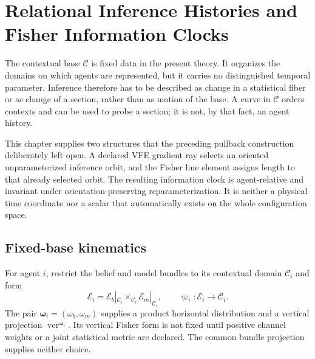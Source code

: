 \chapter{Relational Inference Histories and Fisher Information Clocks}
\label{ch:relational-inference}

The contextual base $\mathcal C$ is fixed data in the present theory.  It
organizes the domains on which agents are represented, but it carries no
distinguished temporal parameter.  Inference therefore has to be described
as change in a statistical fiber or as change of a section, rather than as
motion of the base.  A curve in $\mathcal C$ orders contexts and can be used
to probe a section; it is not, by that fact, an agent history.

This chapter supplies two structures that the preceding pullback construction
deliberately left open.  A declared VFE gradient ray selects an oriented
unparameterized inference orbit, and the Fisher line element assigns length
to that already selected orbit.  The resulting information clock is
agent-relative and invariant under orientation-preserving
reparameterization.  It is neither a physical time coordinate nor a scalar
that automatically exists on the whole configuration space.

\section{Fixed-base kinematics}
\label{sec:hist-fixed-base-kinematics}

For agent $i$, restrict the belief and model bundles to its contextual domain
$\mathcal C_i$ and form
\begin{equation}
\mathcal E_i
=\mathcal E_b|_{\mathcal C_i}
\times_{\mathcal C_i}
\mathcal E_m|_{\mathcal C_i},
\qquad
\varpi_i:\mathcal E_i\longrightarrow\mathcal C_i.
\label{eq:hist-agent-product-bundle}
\end{equation}
The pair $\boldsymbol\omega_i=(\omega_b,\omega_m)$ supplies a product
horizontal distribution and a vertical projection
$\operatorname{ver}^{\boldsymbol\omega_i}$.  Its vertical Fisher form is not
fixed until positive channel weights or a joint statistical metric are
declared.  The common bundle projection supplies neither choice.

